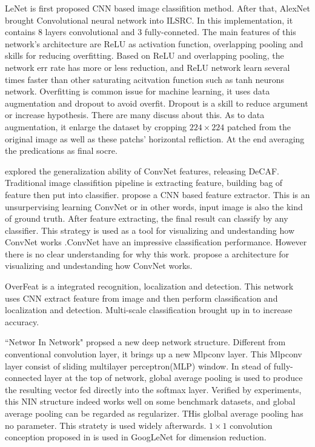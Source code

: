 \documentclass[10pt,twocolumn,letterpaper]{article}
\begin{document}
\par
LeNet\cite{lecun1990handwritten} \cite{leou11comparison} is first proposed CNN based image classifition method. After that, AlexNet\cite{krizhevsky2012imagenet} brought Convolutional neural network into ILSRC. In this implementation, it contains 8 layers  convolutional and 3 fully-conneted. The main features of this network's architecture are ReLU\cite{nair2010rectified} as activation function, overlapping pooling and skills for reducing overfitting. Based on ReLU and overlapping pooling, the network err rate has more or less reduction, and ReLU network learn several times faster than other saturating acitvation function such as tanh neurons network. Overfitting is common issue for machine learning, it uses data augmentation and dropout to avoid overfit. Dropout is a skill to reduce argument or increase hypothesis. There are many discuss about this. As to data augmentation, it enlarge the dataset by cropping $224\times 224$ patched from the original image as well as these patchs' horizontal refliction. At the end averaging the predications as final socre.
\par
\cite{donahue2014decaf} explored the generalization ability of ConvNet features, releasing DeCAF. Traditional image classifition pipeline is extracting feature, building bag of feature then put into classifier. \cite{zeiler2011adaptive} propose a CNN based feature extractor. This is an unsurpervising learning ConvNet or in other words, input image is also the kind of ground truth. After feature extracting, the final result can classify by any classifier. This strategy is used as a tool for visualizing and undestanding how ConvNet works \cite{zeiler2014visualizing}.ConvNet have an impressive classification performance. However there is no clear understanding for why this work. \cite{zeiler2014visualizing} propose a architecture for visualizing and undestanding how ConvNet works.
\par
OverFeat\cite{sermanet2013overfeat} is a integrated recognition, localization and detection. This network uses CNN extract feature from image and then perform classification and localization and detection. Multi-scale classification brought up in \cite{sermanet2013overfeat} to increase accuracy.
\par
``Networ In Network"\cite{lin2013network} propsed a new deep network structure. Different from conventional convolution layer, it brings up a new Mlpconv layer. This Mlpconv layer consist of sliding multilayer perceptron(MLP) window. In stead of fully-connected layer at the top of network, global average pooling is used to produce the resulting vector fed directly into the softmax layer. Verified by experiments, this NIN structure indeed works well on some benchmark datasets, and global average pooling can be regarded as regularizer. THis glolbal average pooling has no parameter. This stratety is used widely afterwards. $1\times 1$ convolution conception proposed in \cite{lin2013network} is used in GoogLeNet for dimension reduction.
\end{document}
